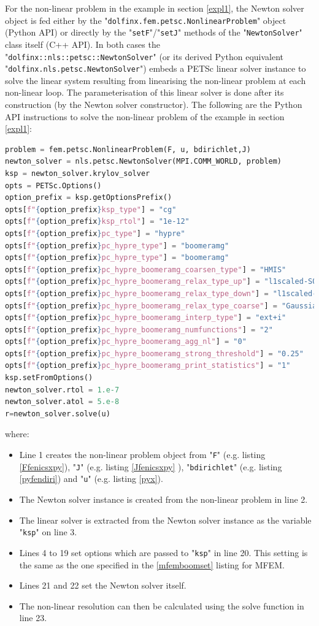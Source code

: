 \documentclass[12pt]{article}
\newcommand{\mycode}[1]{\textsf{"}\lstinline`#1`\textsf{"}}
\newcommand{\mycodepy}[1]{\textsf{"}\lstinline[language=Python]`#1`\textsf{"}}
\begin{document}
For the non-linear problem in the example in section \ref{expl1}, the Newton solver object is fed either by the \mycodepy{dolfinx.fem.petsc.NonlinearProblem} object (Python API) or directly by the \mycode{setF}/\mycode{setJ} methods of the \mycode{NewtonSolver} class itself (C++ API).
In both cases the \mycode{dolfinx::nls::petsc::NewtonSolver} (or its derived Python equivalent \mycodepy{dolfinx.nls.petsc.NewtonSolver}) embeds a PETSc linear solver instance to solve the linear system resulting from linearising the non-linear problem at each non-linear loop.
The parameterisation of this linear solver is done after its construction (by the Newton solver constructor). 
The following are the Python API instructions to solve the non-linear problem of the example in section \ref{expl1}:
\begin{lstlisting}[basicstyle=\footnotesize,language=python,label=fenlinsolverpy]
problem = fem.petsc.NonlinearProblem(F, u, bdirichlet,J)
newton_solver = nls.petsc.NewtonSolver(MPI.COMM_WORLD, problem)
ksp = newton_solver.krylov_solver
opts = PETSc.Options()
option_prefix = ksp.getOptionsPrefix()
opts[f"{option_prefix}ksp_type"] = "cg"
opts[f"{option_prefix}ksp_rtol"] = "1e-12"
opts[f"{option_prefix}pc_type"] = "hypre"
opts[f"{option_prefix}pc_hypre_type"] = "boomeramg"
opts[f"{option_prefix}pc_hypre_type"] = "boomeramg"
opts[f"{option_prefix}pc_hypre_boomeramg_coarsen_type"] = "HMIS"
opts[f"{option_prefix}pc_hypre_boomeramg_relax_type_up"] = "l1scaled-SOR/Jacobi"
opts[f"{option_prefix}pc_hypre_boomeramg_relax_type_down"] = "l1scaled-SOR/Jacobi"
opts[f"{option_prefix}pc_hypre_boomeramg_relax_type_coarse"] = "Gaussian-elimination"
opts[f"{option_prefix}pc_hypre_boomeramg_interp_type"] = "ext+i"
opts[f"{option_prefix}pc_hypre_boomeramg_numfunctions"] = "2"
opts[f"{option_prefix}pc_hypre_boomeramg_agg_nl"] = "0"
opts[f"{option_prefix}pc_hypre_boomeramg_strong_threshold"] = "0.25"
opts[f"{option_prefix}pc_hypre_boomeramg_print_statistics"] = "1"
ksp.setFromOptions()
newton_solver.rtol = 1.e-7
newton_solver.atol = 5.e-8
r=newton_solver.solve(u)
\end{lstlisting}
where:
\begin{itemize}
	\item Line 1 creates the non-linear problem object from \mycodepy{F} (e.g. listing \ref{Ffenicsxpy}), \mycodepy{J} (e.g. listing \ref{Jfenicsxpy} ), \mycodepy{bdirichlet} (e.g. listing \ref{pyfendiri}) and \mycodepy{u} (e.g. listing \ref{pyx}).
	\item The Newton solver instance is created from the non-linear problem in line 2.
	\item The linear solver is extracted from the Newton solver instance as the variable \mycodepy{ksp} on line 3.
	\item Lines 4 to 19 set options which are passed to \mycodepy{ksp} in line 20. This setting is the same as the one specified in the \ref{mfemboomset} listing for MFEM.
	\item Lines 21 and 22 set the Newton solver itself.
	\item The non-linear resolution can then be calculated using the solve function in line 23.
\end{itemize}
\end{document}
